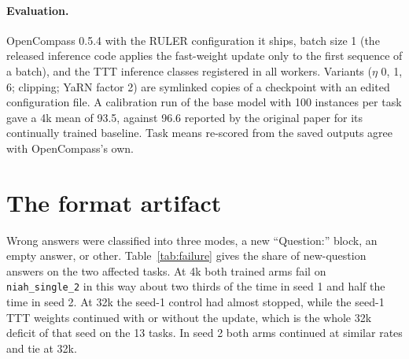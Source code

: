\documentclass{article}
\begin{document}
\begin{table}[H]
\caption{Training corpus (3.25B tokens in 99,217 sequences of 32,736 tokens).}
\label{tab:corpus}
\centering
\footnotesize
{}
\end{table}

\paragraph{Evaluation.} OpenCompass 0.5.4 with the RULER configuration it ships, batch size 1 (the released inference code applies the fast-weight update only to the first sequence of a batch), and the TTT inference classes registered in all workers. Variants ($\eta$ 0, 1, 6; clipping; YaRN factor 2) are symlinked copies of a checkpoint with an edited configuration file. A calibration run of the base model with 100 instances per task gave a 4k mean of 93.5, against 96.6 reported by the original paper for its continually trained baseline. Task means re-scored from the saved outputs agree with OpenCompass's own.

\section{The format artifact}\label{app:artifact}

Wrong answers were classified into three modes, a new ``Question:'' block, an empty answer, or other. Table~\ref{tab:failure} gives the share of new-question answers on the two affected tasks. At 4k both trained arms fail on \texttt{niah\_single\_2} in this way about two thirds of the time in seed 1 and half the time in seed 2. At 32k the seed-1 control had almost stopped, while the seed-1 TTT weights continued with or without the update, which is the whole 32k deficit of that seed on the 13 tasks. In seed 2 both arms continued at similar rates and tie at 32k.
\end{document}
